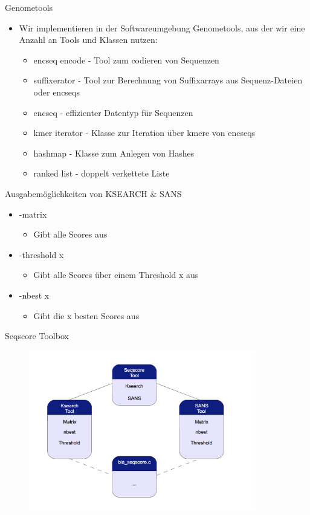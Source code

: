 \documentclass[xcolor=dvipsnames, aspectratio=1610]{beamer}
\begin{document}
\begin{frame}{Genometools}
  \begin{itemize}

    \item Wir implementieren in der Softwareumgebung Genometools, aus der wir eine Anzahl an Tools und Klassen nutzen:
    \begin{itemize}
      \item encseq encode - Tool zum codieren von Sequenzen 
      \item suffixerator - Tool zur Berechnung von Suffixarrays aus Sequenz-Dateien oder encseqs
      \item encseq - effizienter Datentyp für Sequenzen
      \item kmer iterator - Klasse zur Iteration über kmere von encseqs
      \item hashmap - Klasse zum Anlegen von Hashes
      \item ranked list - doppelt verkettete Liste

    \end{itemize}    
  \end{itemize}
\end{frame}


\begin{frame}{Ausgabemöglichkeiten von KSEARCH \& SANS}
  \begin{itemize}
    \item -matrix 
      \begin{itemize}
        \item Gibt alle Scores aus
      \end{itemize}           
    \item -threshold x 
      \begin{itemize}
        \item  Gibt alle Scores über einem Threshold x aus
      \end{itemize}
    \item -nbest x
      \begin{itemize}
        \item  Gibt die x besten Scores aus
      \end{itemize} 
  \end{itemize}
\end{frame}

\begin{frame}{Seqscore Toolbox}
  \begin{figure}[h]
    \includegraphics[height=7cm]{img/dia1.png}
  \end{figure}
\end{frame}
\end{document}

